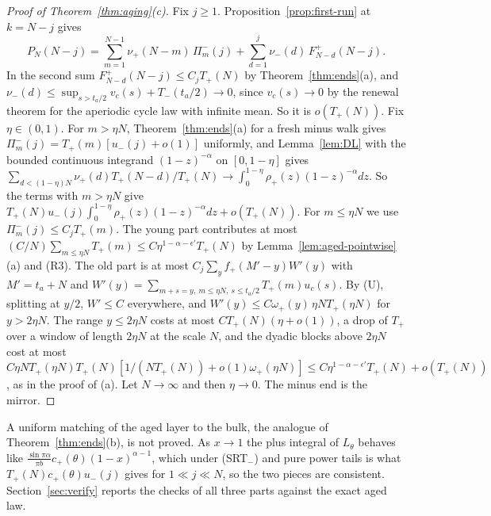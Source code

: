 \begin{proof}[Proof of Theorem~\ref{thm:aging}(c)]
Fix $j\ge1$. Proposition~\ref{prop:first-run} at $k=N-j$ gives
\[
 P_N(N-j)=\sum_{m=1}^{N-1}\nu_\plus(N-m)\,\Pi^\minus_m(j)+\sum_{d=1}^{j}\nu_\minus(d)\,F^\plus_{N-d}(N-j).
\]
In the second sum $F^\plus_{N-d}(N-j)\le C_jT_\plus(N)$ by Theorem~\ref{thm:ends}(a), and
$\nu_\minus(d)\le\sup_{s>t_a/2}v_c(s)+T_\minus(t_a/2)\to0$, since $v_c(s)\to0$ by the renewal
theorem for the aperiodic cycle law with infinite mean. So it is $o(T_\plus(N))$. Fix
$\eta\in(0,1)$. For $m>\eta N$, Theorem~\ref{thm:ends}(a) for a fresh minus walk gives
$\Pi^\minus_m(j)=T_\plus(m)[u_\minus(j)+o(1)]$ uniformly, and Lemma~\ref{lem:DL} with the bounded
continuous integrand $(1-z)^{-\alpha}$ on $[0,1-\eta]$ gives
$\sum_{d<(1-\eta)N}\nu_\plus(d)T_\plus(N-d)/T_\plus(N)\to\int_0^{1-\eta}\rho_\plus(z)(1-z)^{-\alpha}dz$. So the
terms with $m>\eta N$ give $T_\plus(N)u_\minus(j)\int_0^{1-\eta}\rho_\plus(z)(1-z)^{-\alpha}dz+o(T_\plus(N))$.
For $m\le\eta N$ we use $\Pi^\minus_m(j)\le C_jT_\plus(m)$. The young part contributes at most
$(C/N)\sum_{m\le\eta N}T_\plus(m)\le C\eta^{1-\alpha-\epsilon'}T_\plus(N)$ by
Lemma~\ref{lem:aged-pointwise}(a) and (R3). The old part is at most
$C_j\sum_yf_\plus(M'-y)W'(y)$ with $M'=t_a+N$ and
$W'(y)=\sum_{m+s=y,\ m\le\eta N,\ s\le t_a/2}T_\plus(m)u_c(s)$. By (U), splitting at $y/2$,
$W'\le C$ everywhere, and $W'(y)\le C\omega_\plus(y)\,\eta NT_\plus(\eta N)$ for $y>2\eta N$. The
range $y\le2\eta N$ costs at most $CT_\plus(N)(\eta+o(1))$, a drop of $T_\plus$ over a window of
length $2\eta N$ at the scale $N$, and the dyadic blocks above $2\eta N$ cost at most
$C\eta NT_\plus(\eta N)T_\plus(N)[1/(NT_\plus(N))+o(1)\omega_\plus(\eta N)]\le C\eta^{1-\alpha-\epsilon'}T_\plus(N)+o(T_\plus(N))$,
as in the proof of (a). Let $N\to\infty$ and then $\eta\to0$. The minus end is the mirror.
\end{proof}

A uniform matching of the aged layer to the bulk, the analogue of Theorem~\ref{thm:ends}(b),
is not proved. As $x\to1$ the plus integral of $L_\theta$ behaves like
$\frac{\sin\pi\alpha}{\pi b}c_\plus(\theta)(1-x)^{\alpha-1}$, which under (SRT$_\minus$) and pure power
tails is what $T_\plus(N)c_\plus(\theta)u_\minus(j)$ gives for $1\ll j\ll N$, so the two pieces are
consistent. Section~\ref{sec:verify} reports the checks of all three parts against the exact
aged law.
